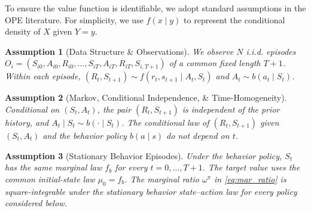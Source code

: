 \documentclass[12pt]{article}
\newtheorem{assumption}{Assumption}
\theoremstyle{remark}\newtheorem{remark}[theorem]{Remark}\theoremstyle{plain}
\begin{document}
To ensure the value function is identifiable, we adopt standard assumptions in the OPE literature.
For simplicity, we use $f(x \mid y)$ to represent the conditional density of $X$ given $Y = y$.

\begin{assumption}[Data Structure \& Observations]\label{ass:data_obs}
    We observe $N$ i.i.d. episodes
    $O_i=(S_{i0},A_{i0},R_{i0},\ldots,
    S_{iT},A_{iT},R_{iT},S_{i,T+1})$ of a common fixed length
    $T+1$.  Within each episode,
    $(R_t,S_{t+1})\sim f(r_t,s_{t+1}\mid A_t,S_t)$ and
    $A_t\sim b(a_t\mid S_t)$.
\end{assumption}

\begin{assumption}[Markov, Conditional Independence, \& Time-Homogeneity]\label{ass:Mark} 
    Conditional on $(S_t,A_t)$, the pair $(R_t,S_{t+1})$ is
    independent of the prior history, and
    $A_t\mid S_t\sim b(\cdot\mid S_t)$.  The conditional law of
    $(R_t,S_{t+1})$ given $(S_t,A_t)$ and the behavior policy
    $b(a\mid s)$ do not depend on $t$.
\end{assumption}

\begin{assumption}[Stationary Behavior Episodes]\label{ass:stationary}
    Under the behavior policy, $S_t$ has the same marginal law
    $f_b$ for every $t=0,\ldots,T+1$.  The target value uses the
    common initial-state law $\mu_0=f_b$.  The marginal ratio
    $\omega^\pi$ in \eqref{eq:mar_ratio} is square-integrable under
    the stationary behavior state--action law for every policy
    considered below.
\end{assumption}
\end{document}
